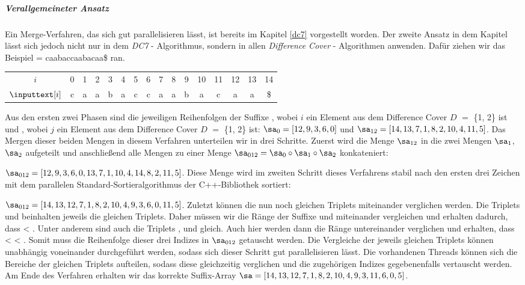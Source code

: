 \subparagraph*{Verallgemeineter Ansatz}

Ein Merge-Verfahren, das sich gut parallelisieren lässt, ist bereits im Kapitel \ref{dc7} vorgestellt worden. Der zweite Ansatz in dem Kapitel lässt sich jedoch nicht nur in dem \emph{DC7} - Algorithmus, sondern in allen \emph{Difference Cover} - Algorithmen anwenden.
Dafür ziehen wir das Beispiel  = caabaccaabacaa\$ ran.

\begin{table}[H]
	\centering
	\begin{tabular}{c| c c c c c c c c c c c c c c c}
		$i$ & 0 & 1 & 2 & 3 & 4 & 5 & 6 & 7 & 8 & 9 & 10 & 11 & 12 & 13 & 14 \\
		$\inputtext[i]$ & c & a & a & b & a & c & c & a & a & b & a & c & a & a & \$
	\end{tabular}
\end{table}

Aus den ersten zwei Phasen sind die jeweiligen Reihenfolgen der Suffixe , wobei $i$ ein Element aus dem Difference Cover \(D\) $=$ \{1, 2\} ist und , wobei $j$ ein Element aus dem Difference Cover \(D\) $=$ \{1, 2\} ist:
$\sa_{0} = [12, 9, 3, 6, 0]$ und $\sa_{12} = [14, 13, 7, 1, 8, 2, 10, 4, 11, 5]$.
Das Mergen dieser beiden Mengen in diesem Verfahren unterteilen wir in drei Schritte. Zuerst wird die Menge $\sa_{12}$ in die zwei Mengen $\sa_1$, $\sa_2$ aufgeteilt und anschließend alle Mengen zu einer Menge $\sa_{012} = \sa_0 \circ \sa_1 \circ \sa_2$ konkateniert:

$\sa_{012} = [12, 9, 3, 6, 0, 13, 7, 1, 10, 4, 14, 8, 2, 11, 5]$.
Diese Menge wird im zweiten Schritt dieses Verfahrens stabil nach den ersten drei Zeichen mit dem parallelen Standard-Sortieralgorithmus der C++-Bibliothek sortiert:

$\sa_{012} = [14, 13, 12, 7, 1, 8, 2, 10, 4, 9, 3, 6, 0, 11, 5]$. Zuletzt können die nun noch gleichen Triplets miteinander verglichen werden. Die Triplets  und  beinhalten jeweils die gleichen Triplets. Daher müssen wir die Ränge der Suffixe  und  miteinander vergleichen und erhalten dadurch, dass  < . Unter anderem sind auch die Triplets ,  und  gleich. Auch hier werden dann die Ränge untereinander verglichen und erhalten, dass  <  < . Somit muss die Reihenfolge dieser drei Indizes in $\sa_{012}$ getauscht werden. Die Vergleiche der jeweils gleichen Triplets können unabhängig voneinander durchgeführt werden, sodass sich dieser Schritt gut parallelisieren lässt. Die vorhandenen Threads können sich die Bereiche der gleichen Triplets aufteilen, sodass diese gleichzeitig verglichen und die zugehörigen Indizes gegebenenfalls vertauscht werden. Am Ende des Verfahren erhalten wir das korrekte Suffix-Array $\sa = [14, 13, 12, 7, 1, 8, 2, 10, 4, 9, 3, 11, 6, 0, 5]$.